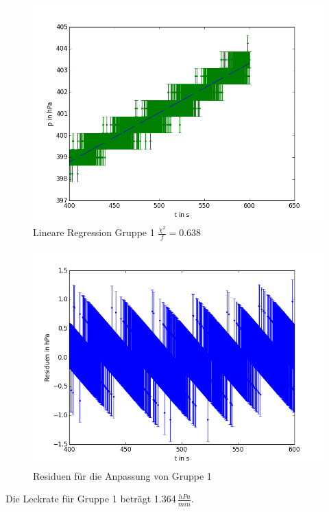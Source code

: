 \documentclass[12pt,a4paper]{article}
\begin{document}
\begin{figure}[H]
\centering
\includegraphics[scale=0.5]{Bilder/dichtigkeit__JM.png}
\caption{Lineare Regression Gruppe 1 $\frac{\chi^2}{f}=0.638$}
\end{figure}

\begin{figure}[H]
\centering
\includegraphics[scale=0.5]{Bilder/residuen_dichtigkeit_JM.png}
\caption{Residuen für die Anpassung von Gruppe 1}
\end{figure}

Die Leckrate für Gruppe 1 beträgt 1.364$\,\frac{hPa}{min}$.
\newpage
\end{document}
